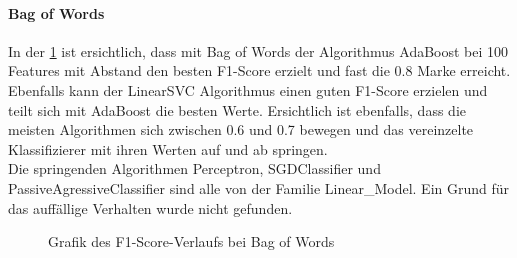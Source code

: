 \paragraph{Bag of Words}
In der \cref{abb:bow-f1} ist ersichtlich, dass mit \glqq Bag of Words\grqq{} der Algorithmus AdaBoost bei 100 Features mit Abstand den besten F1-Score erzielt und fast die 0.8 Marke erreicht.
Ebenfalls kann der LinearSVC Algorithmus einen guten F1-Score erzielen und teilt sich mit AdaBoost die besten Werte.
Ersichtlich ist ebenfalls, dass die meisten Algorithmen sich zwischen 0.6 und 0.7 bewegen und das vereinzelte Klassifizierer mit ihren Werten auf und ab springen.\\
Die springenden Algorithmen Perceptron, SGDClassifier und PassiveAgressiveClassifier sind alle von der Familie \glqq Linear\_Model\grqq{}. Ein Grund für das auffällige Verhalten wurde nicht gefunden.
\begin{figure}[H]	
	\setlength{\fboxsep}{0.3pt} 
	\setlength{\fboxrule}{0.3pt} 
	\caption{Grafik des F1-Score-Verlaufs bei Bag of Words}
	\label{abb:bow-f1}
\end{figure}
